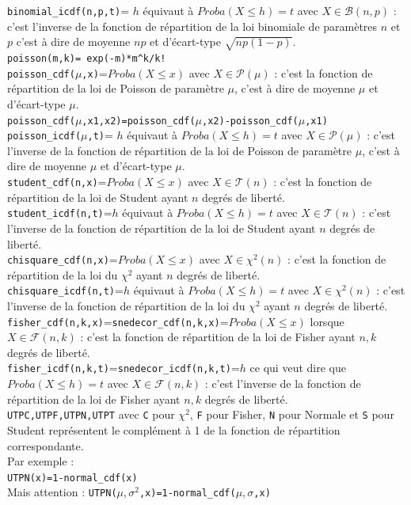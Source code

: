 \documentclass[a4paper,11pt]{book}
\begin{document}
{\tt binomial\_icdf(n,p,t)}= $h$ \'equivaut \`a $Proba(X\leq h)=t$ avec 
$X\in \mathcal B(n,p)$ : c'est l'inverse de la 
fonction de r\'epartition de la loi 
binomiale de param\`etres $n$ et $p$ c'est \`a dire
de moyenne $np$ et d'\'ecart-type $\sqrt{np(1-p)}$.\\
{\tt poisson(m,k)= exp(-m)*m\verb|^|k/k!}\\
{\tt poisson\_cdf($\mu$,x)}=$Proba(X\leq x)$ avec $X\in \mathcal P(\mu)$ : 
c'est la fonction de r\'epartition de la loi de Poisson de param\`etre $\mu$,
 c'est \`a dire de moyenne $\mu$ et d'\'ecart-type $\mu$.\\
{\tt poisson\_cdf($\mu$,x1,x2)=poisson\_cdf($\mu$,x2)-poisson\_cdf($\mu$,x1)}\\
{\tt poisson\_icdf($\mu$,t)}= $h$ \'equivaut \`a $Proba(X\leq h)=t$ avec 
$X\in \mathcal P(\mu)$ : c'est l'inverse de la fonction de r\'epartition de 
la loi de Poisson de param\`etre $\mu$, c'est \`a dire de moyenne $\mu$ et 
d'\'ecart-type $\mu$.\\
{\tt student\_cdf(n,x)}=$Proba(X\leq x)$ avec $X\in \mathcal T(n)$ : c'est la 
fonction de r\'epartition de la loi de Student
 ayant $n$ degr\'es de libert\'e.\\
{\tt student\_icdf(n,t)}=$h$ \'equivaut \`a $Proba(X\leq h)=t$ avec 
$X\in \mathcal T(n)$ : c'est l'inverse de la fonction de r\'epartition de la 
loi de  Student ayant $n$ degr\'es de libert\'e.\\
{\tt chisquare\_cdf(n,x)}=$Proba(X\leq x)$ avec $X\in \mathcal \chi^2(n)$ : 
c'est la fonction de r\'epartition de la loi du $\chi^2$
 ayant $n$ degr\'es de libert\'e.\\
{\tt chisquare\_icdf(n,t)}=$h$ \'equivaut \`a $Proba(X\leq h)=t$ avec 
$X\in \mathcal \chi^2(n)$ : c'est l'inverse de la fonction de r\'epartition de 
la loi du $\chi^2$ ayant $n$ degr\'es de libert\'e.\\
{\tt fisher\_cdf(n,k,x)}={\tt snedecor\_cdf(n,k,x)}=$Proba(X\leq x)$ lorsque 
 $X\in \mathcal F(n,k)$ : c'est 
la fonction de r\'epartition de la loi de Fisher ayant $n,k$ degr\'es de 
libert\'e.\\
{\tt fisher\_icdf(n,k,t)}={\tt snedecor\_icdf(n,k,t)}=$h$ ce qui veut dire que
$Proba(X\leq h)=t$ avec 
$X\in \mathcal F(n,k)$ : c'est l'inverse de la fonction de r\'epartition de la 
loi de Fisher ayant $n,k$ degr\'es de libert\'e.\\
{\tt UTPC,UTPF,UTPN,UTPT} avec {\tt C} pour $\chi^2$, {\tt F} pour Fisher, 
{\tt N} pour Normale et {\tt S} pour Student repr\'esentent le compl\'ement \`a
 1 de la fonction de r\'epartition correspondante.\\
Par exemple :\\
{\tt UTPN(x)=1-normal\_cdf(x)} \\ 
Mais attention : {\tt UTPN($\mu ,\sigma^2$,x)=1-normal\_cdf($\mu ,\sigma$,x)} 
\end{document}

